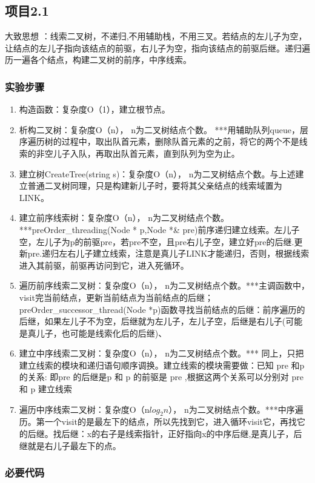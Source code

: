 \subsection{项目2.1}
大致思想 ：线索二叉树，不递归,不用辅助栈，不用三叉。若结点的左儿子为空，让结点的左儿子指向该结点的前驱，右儿子为空，指向该结点的前驱后继。递归遍历一遍各个结点，构建二叉树的前序，中序线索。
\subsubsection{实验步骤}
\begin{enumerate}
\item 构造函数：复杂度O（1），建立根节点。
\item 析构二叉树：复杂度O（n）， n为二叉树结点个数。       ***用辅助队列queue，层序遍历树的过程中，取出队首元素，删除队首元素的之前，将它的两个不是线索的非空儿子入队，再取出队首元素，直到队列为空为止。
\item 建立树CreateTree(string s)：复杂度O（n）， n为二叉树结点个数。与上述建立普通二叉树同理，只是构建新儿子时，要将其父亲结点的线索域置为LINK。
\item 建立前序线索树：复杂度O（n）， n为二叉树结点个数。***preOrder\_threading(Node * p,Node *\& pre)前序递归建立线索。左儿子空，左儿子为p的前驱pre，若pre不空，且pre右儿子空，建立好pre的后继.更新pre.递归左右儿子建立线索，注意是真儿子LINK才能递归，否则，根据线索进入其前驱，前驱再访问到它，进入死循环。
\item 遍历前序线索二叉树：复杂度O（n）， n为二叉树结点个数。***主调函数中，visit完当前结点，更新当前结点为当前结点的后继； preOrder\_successor\_thread(Node *p)函数寻找当前结点的后继：前序遍历的后继，如果左儿子不为空，后继就为左儿子，左儿子空，后继是右儿子(可能是真儿子，也可能是线索化后的后继)、
\item 建立中序线索二叉树：复杂度O（n）， n为二叉树结点个数。*** 同上，只把建立线索的模块和递归语句顺序调换。建立线索的模块需要做：已知 pre 和p 的关系: 即pre 的后继是p 和 p 的前驱是 pre ,根据这两个关系可以分别对 pre 和 p 建立线索
\item 遍历中序线索二叉树：复杂度O（n$log_2 n$）， n为二叉树结点个数。***中序遍历。第一个visit的是最左下的结点，所以先找到它，进入循环visit它，再找它的后继。找后继：x的右子是线索指针，正好指向x的中序后继,是真儿子，后继就是右儿子最左下的点。
\end{enumerate}
\subsubsection{必要代码}

